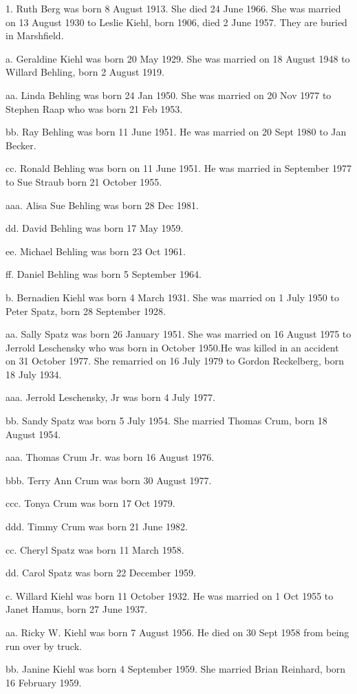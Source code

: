 \documentclass[a4paper]{article}
\begin{document}
1. Ruth Berg was born 8 August 1913.  She died 24 June 1966.  She was married on 13 August 1930 to Leslie Kiehl, born 1906, died 2 June 1957.  They are buried in Marshfield.

a. Geraldine Kiehl was born 20 May 1929.  She was married on 18 August 1948 to Willard Behling, born 2 August 1919.  

aa. Linda Behling was born 24 Jan 1950.  She was married on 20 Nov 1977 to Stephen Raap who was born 21 Feb 1953.

bb. Ray Behling was born 11 June 1951.  He was married on 20 Sept 1980 to Jan Becker.

cc. Ronald Behling was born on 11 June 1951.  He was married in September 1977 to Sue Straub born 21 October 1955.

aaa. Alisa Sue Behling was born 28 Dec 1981.

dd. David Behling was born 17 May 1959.

ee. Michael Behling was born 23 Oct 1961.

ff. Daniel Behling was born 5 September 1964.

b. Bernadien Kiehl was born 4 March 1931.   She was married on 1 July 1950 to Peter Spatz, born 28 September 1928.

aa. Sally Spatz was born 26 January 1951.  She was married on 16 August 1975 to Jerrold Leschensky who was born in October 1950.He was killed in an accident on 31 October 1977. She remarried	on 16 July 1979 to Gordon Reckelberg, born 18 July 1934.

aaa. Jerrold Leschensky, Jr was born 4 July 1977.

bb. Sandy Spatz was born 5 July 1954.  She married Thomas Crum, born 18 August 1954.

aaa. Thomas Crum Jr. was born 16 August 1976.

bbb. Terry Ann Crum was born 30 August 1977.

ccc. Tonya Crum was  born 17 Oct 1979.

ddd. Timmy Crum was born 21 June 1982.

cc. Cheryl Spatz was born 11 March 1958.

dd. Carol Spatz was born 22 December 1959.

c. Willard Kiehl was born 11 October 1932.  He was married on 1 Oct 1955 to Janet Hamus, born 27 June 1937.

aa. Ricky W. Kiehl was born 7 August 1956.  He died on 30 Sept 1958 from being run over by truck.

bb. Janine Kiehl was born 4 September 1959.  She married Brian Reinhard, born 16 February 1959.
\end{document}
